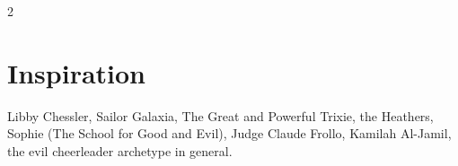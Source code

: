 \begin{multicols}{2}
\section*{Inspiration}

Libby Chessler, Sailor Galaxia, The Great and Powerful Trixie, the Heathers, Sophie (The School for Good and Evil), Judge Claude Frollo, Kamilah Al-Jamil, the evil cheerleader archetype in general. 

\end{multicols}

